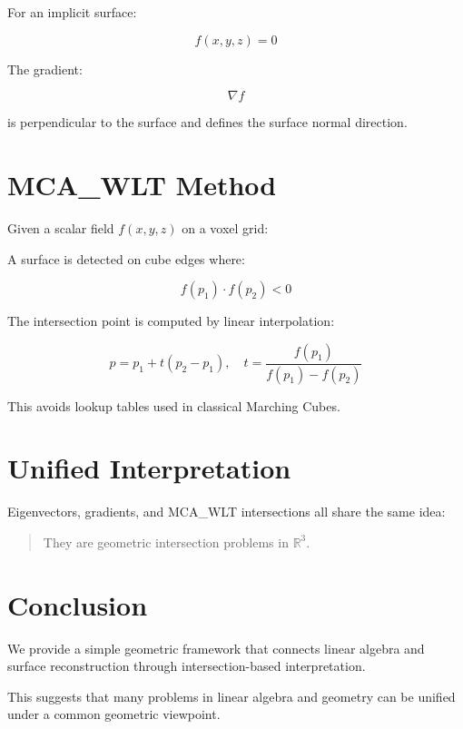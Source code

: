 \documentclass[11pt]{article}
\begin{document}
For an implicit surface:

\[
f(x,y,z)=0
\]

The gradient:

\[
\nabla f
\]

is perpendicular to the surface and defines the surface normal direction.

\section{MCA\_WLT Method}

Given a scalar field $f(x,y,z)$ on a voxel grid:

A surface is detected on cube edges where:

\[
f(p_1)\cdot f(p_2) < 0
\]

The intersection point is computed by linear interpolation:

\[
p = p_1 + t(p_2 - p_1), \quad
t = \frac{f(p_1)}{f(p_1)-f(p_2)}
\]

This avoids lookup tables used in classical Marching Cubes.

\section{Unified Interpretation}

Eigenvectors, gradients, and MCA\_WLT intersections all share the same idea:

\begin{quote}
They are geometric intersection problems in $\mathbb{R}^3$.
\end{quote}

\section{Conclusion}

We provide a simple geometric framework that connects linear algebra and surface reconstruction through intersection-based interpretation.

This suggests that many problems in linear algebra and geometry can be unified under a common geometric viewpoint.
\end{document}
